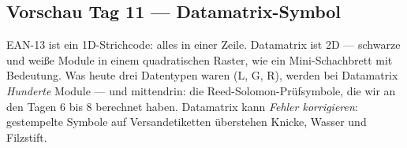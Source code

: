 \subsection*{Vorschau Tag 11 — Datamatrix-Symbol}

EAN-13 ist ein 1D-Strichcode: alles in einer Zeile. Datamatrix ist
2D — schwarze und weiße Module in einem quadratischen Raster, wie
ein Mini-Schachbrett mit Bedeutung. Was heute drei Datentypen waren
(L, G, R), werden bei Datamatrix \emph{Hunderte} Module — und
mittendrin: die Reed-Solomon-Prüfsymbole, die wir an den Tagen 6 bis
8 berechnet haben. Datamatrix kann \emph{Fehler korrigieren}:
gestempelte Symbole auf Versandetiketten überstehen Knicke, Wasser
und Filzstift.
